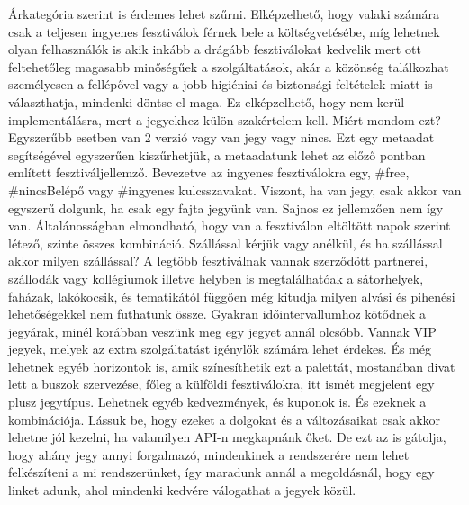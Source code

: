 Árkategória szerint is érdemes lehet szűrni. Elképzelhető, hogy valaki számára csak a teljesen ingyenes fesztiválok férnek bele a költségvetésébe, míg lehetnek olyan felhasználók is akik inkább a drágább fesztiválokat kedvelik mert ott feltehetőleg magasabb minőségűek a szolgáltatások, akár a közönség találkozhat személyesen a fellépővel vagy a jobb higiéniai és biztonsági feltételek miatt is választhatja, mindenki döntse el maga. Ez elképzelhető, hogy nem kerül implementálásra, mert a jegyekhez külön szakértelem kell. Miért mondom ezt? Egyszerűbb esetben van 2 verzió vagy van jegy vagy nincs. Ezt egy metaadat segítségével egyszerűen kiszűrhetjük, a metaadatunk lehet az előző pontban említett fesztiváljellemző. Bevezetve az ingyenes fesztiválokra egy, \#free, \#nincsBelépő vagy \#ingyenes kulcsszavakat. Viszont, ha van jegy, csak akkor van egyszerű dolgunk, ha csak egy fajta jegyünk van. Sajnos ez jellemzően nem így van. Általánosságban elmondható, hogy van a fesztiválon eltöltött napok szerint létező, szinte összes kombináció. Szállással kérjük vagy anélkül, és ha szállással akkor milyen szállással? A legtöbb fesztiválnak vannak szerződött partnerei, szállodák vagy kollégiumok illetve helyben is megtalálhatóak a sátorhelyek, faházak, lakókocsik, és tematikától függően még kitudja milyen alvási és pihenési lehetőségekkel nem futhatunk össze. Gyakran időintervallumhoz kötődnek a jegyárak, minél korábban veszünk meg egy jegyet annál olcsóbb. Vannak VIP jegyek, melyek az extra szolgáltatást igénylők számára lehet érdekes. És még lehetnek egyéb horizontok is, amik színesíthetik ezt a palettát, mostanában divat lett a buszok szervezése, főleg a  külföldi fesztiválokra, itt ismét megjelent egy plusz jegytípus. Lehetnek egyéb kedvezmények, és kuponok is. És ezeknek a kombinációja. Lássuk be, hogy ezeket a dolgokat és a változásaikat csak akkor lehetne jól kezelni, ha valamilyen API-n megkapnánk őket. De ezt az is gátolja, hogy ahány jegy annyi forgalmazó, mindenkinek a rendszerére nem lehet felkészíteni a mi rendszerünket, így maradunk annál a megoldásnál, hogy egy linket adunk, ahol mindenki kedvére válogathat a jegyek közül.


